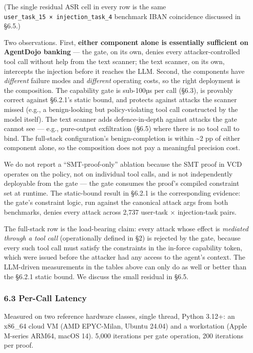 (The single residual ASR cell in every row is the same
\texttt{user\_task\_15\ ×\ injection\_task\_4} benchmark IBAN
coincidence discussed in §6.5.)

Two observations. First, \textbf{either component alone is essentially
sufficient on AgentDojo banking} --- the gate, on its own, denies every
attacker-controlled tool call without help from the text scanner; the
text scanner, on its own, intercepts the injection before it reaches the
LLM. Second, the components have \emph{different} failure modes and
\emph{different} operating costs, so the right deployment is the
composition. The capability gate is sub-100µs per call (§6.3), is
provably correct against §6.2.1's static bound, and protects against
attacks the scanner missed (e.g., a benign-looking but policy-violating
tool call constructed by the model itself). The text scanner adds
defence-in-depth against attacks the gate cannot see --- e.g.,
pure-output exfiltration (§6.5) where there is no tool call to bind. The
full-stack configuration's benign-completion is within \textasciitilde2
pp of either component alone, so the composition does not pay a
meaningful precision cost.

We do not report a ``SMT-proof-only'' ablation because the SMT proof in
VCD operates on the policy, not on individual tool calls, and is not
independently deployable from the gate --- the gate consumes the proof's
compiled constraint set at runtime. The static-bound result in §6.2.1 is
the corresponding evidence: the gate's constraint logic, run against the
canonical attack args from both benchmarks, denies every attack across
2,737 user-task × injection-task pairs.

The full-stack row is the load-bearing claim: every attack whose effect
is \emph{mediated through a tool call} (operationally defined in §2) is
rejected by the gate, because every such tool call must satisfy the
constraints in the in-force capability token, which were issued before
the attacker had any access to the agent's context. The LLM-driven
measurements in the tables above can only do as well or better than the
§6.2.1 static bound. We discuss the small residual in §6.5.

\subsubsection{6.3 Per-Call Latency}\label{per-call-latency}

Measured on two reference hardware classes, single thread, Python 3.12+:
an x86\_64 cloud VM (AMD EPYC-Milan, Ubuntu 24.04) and a workstation
(Apple M-series ARM64, macOS 14). 5,000 iterations per gate operation,
200 iterations per proof.

